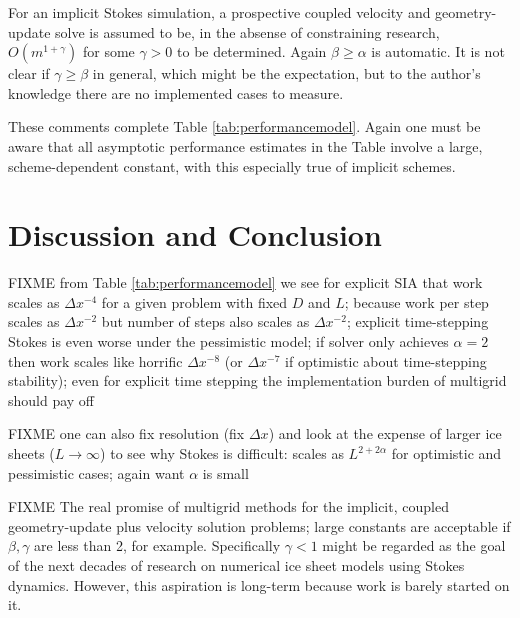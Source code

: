 \documentclass[twocolumn,letterpaper]{igs}
\begin{document}
For an implicit Stokes simulation, a prospective coupled velocity and geometry-update solve is assumed to be, in the absense of constraining research, $O(m^{1+\gamma})$ for some $\gamma>0$ to be determined.  Again $\beta \ge \alpha$ is automatic.  It is not clear if $\gamma\ge \beta$ in general, which might be the expectation, but to the author's knowledge there are no implemented cases to measure.

These comments complete Table \ref{tab:performancemodel}.  Again one must be aware that all asymptotic performance estimates in the Table involve a large, scheme-dependent constant, with this especially true of implicit schemes.


\section{Discussion and Conclusion}

FIXME from Table \ref{tab:performancemodel} we see for explicit SIA that work scales as $\Delta x^{-4}$ for a given problem with fixed $D$ and $L$; because work per step scales as $\Delta x^{-2}$ but number of steps also scales as $\Delta x^{-2}$; explicit time-stepping Stokes is even worse under the pessimistic model; if solver only achieves $\alpha=2$ then work scales like horrific $\Delta x^{-8}$ (or $\Delta x^{-7}$ if optimistic about time-stepping stability); even for explicit time stepping the implementation burden of multigrid should pay off

FIXME one can also fix resolution (fix $\Delta x$) and look at the expense of larger ice sheets ($L\to \infty$) to see why Stokes is difficult: scales as $L^{2+2\alpha}$ for optimistic and pessimistic cases; again want $\alpha$ is small

FIXME The real promise of multigrid methods for the implicit, coupled geometry-update plus velocity solution problems; large constants are acceptable if $\beta,\gamma$ are less than 2, for example.  Specifically $\gamma < 1$ might be regarded as the goal of the next decades of research on numerical ice sheet models using Stokes dynamics.  However, this aspiration is long-term because work is barely started on it.



\end{document}
